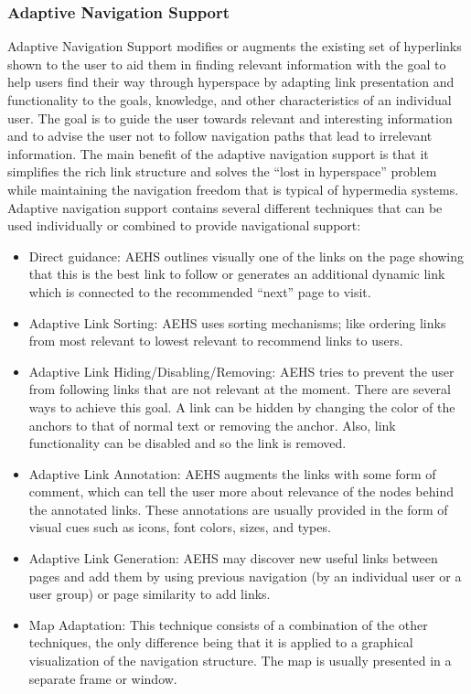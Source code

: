 \documentclass[12pt,a4paper,final,twoside,onecolumn,titlepage]{book}
\begin{document}
\subsubsection{Adaptive Navigation Support}
Adaptive Navigation Support modifies or augments the existing set of hyperlinks shown to the user to aid them in finding relevant information with the goal to help users find their way through hyperspace by adapting link presentation and functionality to the goals, knowledge, and other characteristics of an individual user. The goal is to guide the user towards relevant and interesting information and to advise the user not to follow navigation paths that lead to irrelevant information. The main benefit of the adaptive navigation support is that it simplifies the rich link structure and solves the “lost in hyperspace” problem while maintaining the navigation freedom that is typical of hypermedia systems. Adaptive navigation support contains several different techniques that can be used individually or combined to provide navigational support:
\begin{itemize}
\item Direct guidance: \gls{AEHS} outlines visually one of the links on the page showing that this is the best link to follow or generates an additional dynamic link which is connected to the recommended “next” page to visit.
\item Adaptive Link Sorting: \gls{AEHS} uses sorting mechanisms; like ordering links from most relevant to lowest relevant to recommend links to users.
\item Adaptive Link Hiding/Disabling/Removing: \gls{AEHS} tries to prevent the user from following links that are not relevant at the moment. There are several ways to achieve this goal. A link can be hidden by changing the color of the anchors to that of normal text or removing the anchor. Also, link functionality can be disabled and so the link is removed.
\item Adaptive Link Annotation: \gls{AEHS} augments the links with some form of comment, which can tell the user more about relevance of the nodes behind the annotated links. These annotations are usually provided in the form of visual cues such as icons, font colors, sizes, and types.
\item Adaptive Link Generation: \gls{AEHS} may discover new useful links between pages and add them by using previous navigation (by an individual user or a user group) or page similarity to add links.
\item Map Adaptation: This technique consists of a combination of the other techniques, the only difference being that it is applied to a graphical visualization of the navigation structure. The map is usually presented in a separate frame or window.
\end{itemize}
\end{document}
